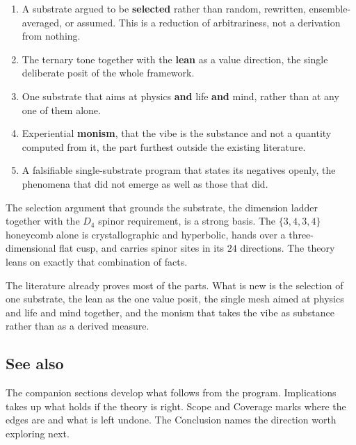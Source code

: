 \begin{enumerate}
\item A substrate argued to be \textbf{selected} rather than random, rewritten, ensemble-averaged, or assumed. This is a reduction of arbitrariness, not a derivation from nothing.
\item The ternary tone together with the \textbf{lean} as a value direction, the single deliberate posit of the whole framework.
\item One substrate that aims at physics \textbf{and} life \textbf{and} mind, rather than at any one of them alone.
\item Experiential \textbf{monism}, that the vibe is the substance and not a quantity computed from it, the part furthest outside the existing literature.
\item A falsifiable single-substrate program that states its negatives openly, the phenomena that did not emerge as well as those that did.
\end{enumerate}

The selection argument that grounds the substrate, the dimension ladder together with the $D_4$ spinor requirement, is a strong basis. The $\{3,4,3,4\}$ honeycomb alone is crystallographic and hyperbolic, hands over a three-dimensional flat cusp, and carries spinor sites in its $24$ directions. The theory leans on exactly that combination of facts.

\begin{principle}
The literature already proves most of the parts. What is new is the selection of one substrate, the lean as the one value posit, the single mesh aimed at physics and life and mind together, and the monism that takes the vibe as substance rather than as a derived measure.
\end{principle}

\subsection*{See also}

The companion sections develop what follows from the program. Implications takes up what holds if the theory is right. Scope and Coverage marks where the edges are and what is left undone. The Conclusion names the direction worth exploring next.
